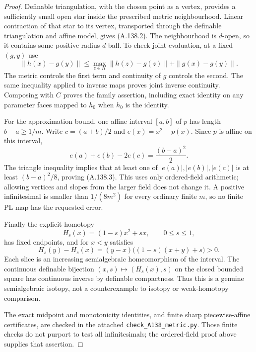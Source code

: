 \begin{proof}
Definable triangulation, with the chosen point as a vertex,
provides a sufficiently small open star inside the prescribed
metric neighbourhood. Linear contraction of that star to its
vertex, transported through the definable triangulation and affine
model, gives (A.138.2). The neighbourhood is $d$-open, so it
contains some positive-radius $d$-ball. To check joint evaluation,
at a fixed $(g,y)$ use
\[
 \|h(x)-g(y)\|
 \le \max_{z\in K}\|h(z)-g(z)\|+\|g(x)-g(y)\|.
\]
The metric controls the first term and continuity of $g$ controls
the second. The same inequality applied to inverse maps proves
joint inverse continuity. Composing with $C$ proves the family
assertion, including exact identity on any parameter faces mapped
to $h_0$ when $h_0$ is the identity.

For the approximation bound, one affine interval $[a,b]$ of $p$
has length $b-a\ge1/m$. Write $c=(a+b)/2$ and
$e(x)=x^2-p(x)$. Since $p$ is affine on this interval,
\[
 e(a)+e(b)-2e(c)=\frac{(b-a)^2}{2}.                     \tag{A.138.5}
\]
The triangle inequality implies that at least one of
$|e(a)|,|e(b)|,|e(c)|$ is at least $(b-a)^2/8$, proving
(A.138.3). This uses only ordered-field arithmetic; allowing
vertices and slopes from the larger field does not change it.
A positive infinitesimal is smaller than $1/(8m^2)$ for every
ordinary finite $m$, so no finite PL map has the requested error.

Finally the explicit homotopy
\[
 H_s(x)=(1-s)x^2+s x,\qquad 0\le s\le1,
\]
has fixed endpoints, and for $x<y$ satisfies
\[
 H_s(y)-H_s(x)=(y-x)\bigl((1-s)(x+y)+s\bigr)>0.
\]
Each slice is an increasing semialgebraic homeomorphism of the
interval. The continuous definable bijection
$(x,s)\mapsto(H_s(x),s)$ on the closed bounded square has
continuous inverse by definable compactness. Thus this is a
genuine semialgebraic isotopy, not a counterexample to isotopy
or weak-homotopy comparison.

The exact midpoint and monotonicity identities, and finite sharp
piecewise-affine certificates, are checked in the attached
\texttt{check\_A138\_metric.py}. Those finite checks do not
purport to test all infinitesimals; the ordered-field proof above
supplies that assertion.
\end{proof}
